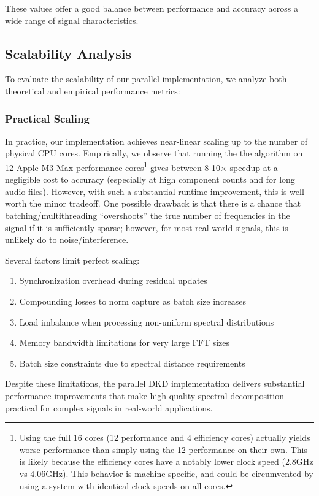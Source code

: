 \documentclass[11pt,twoside]{report}
\numberwithin{thm}{section}
\numberwithin{equation}{section}
\begin{document}
These values offer a good balance between performance and accuracy across a wide range of signal characteristics.

\subsection{Scalability Analysis}

To evaluate the scalability of our parallel implementation, we analyze both theoretical and empirical performance metrics:
\subsubsection{Practical Scaling}

In practice, our implementation achieves near-linear scaling up to the number of physical CPU cores. Empirically, we observe that running the the algorithm on 12 Apple M3 Max performance cores\footnote{Using the full 16 cores (12 performance and 4 efficiency cores) actually yields worse performance than simply using the 12 performance on their own. This is likely because the efficiency cores have a notably lower clock speed (2.8GHz vs 4.06GHz). This behavior is machine specific, and could be circumvented by using a system with identical clock speeds on all cores.} gives between 8-10$\times$ speedup at a negligible cost to accuracy (especially at high component counts and for long audio files). However, with such a substantial runtime improvement, this is well worth the minor tradeoff. One possible drawback is that there is a chance that batching/multithreading ``overshoots'' the true number of frequencies in the signal if it is sufficiently sparse; however, for most real-world signals, this is unlikely do to noise/interference.

Several factors limit perfect scaling:
\begin{enumerate}
    \item Synchronization overhead during residual updates
    \item Compounding losses to norm capture as batch size increases
    \item Load imbalance when processing non-uniform spectral distributions
    \item Memory bandwidth limitations for very large FFT sizes
    \item Batch size constraints due to spectral distance requirements
\end{enumerate}

Despite these limitations, the parallel DKD implementation delivers substantial performance improvements that make high-quality spectral decomposition practical for complex signals in real-world applications.
\end{document}
